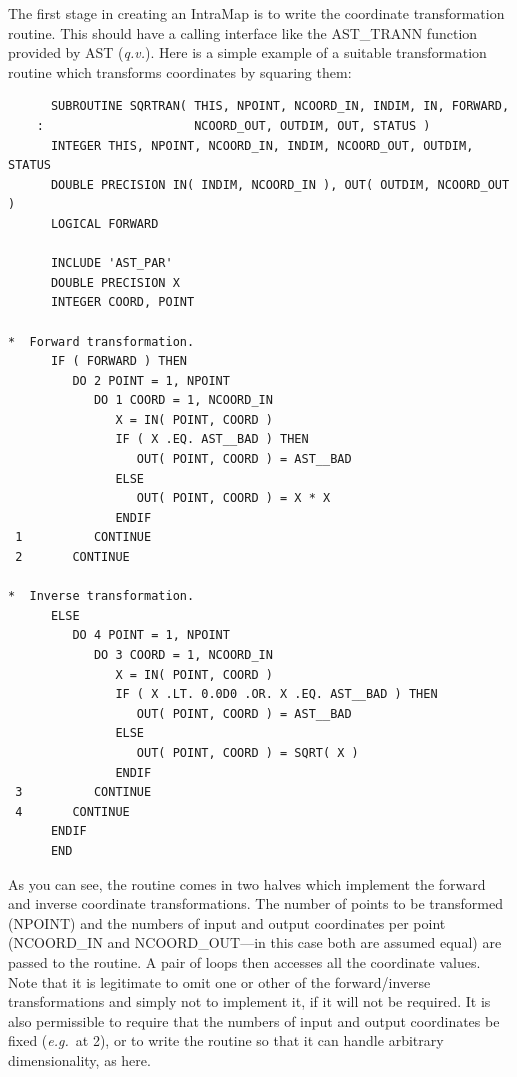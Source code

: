 \documentclass[twoside,11pt]{article}
\newcommand{\htmlref}[2]{#1}
\newcommand{\xlabel}[1]{}
\begin{document}
The first stage in creating an \htmlref{IntraMap}{IntraMap} is to write the coordinate
transformation routine. This should have a calling interface like the
\htmlref{AST\_TRANN}{AST_TRANN} function provided by AST ({\em{q.v.}}). Here is a simple
example of a suitable transformation routine which transforms
coordinates by squaring them:
\xlabel{SqrTran}

\small
\begin{verbatim}
      SUBROUTINE SQRTRAN( THIS, NPOINT, NCOORD_IN, INDIM, IN, FORWARD,
    :                     NCOORD_OUT, OUTDIM, OUT, STATUS )
      INTEGER THIS, NPOINT, NCOORD_IN, INDIM, NCOORD_OUT, OUTDIM, STATUS
      DOUBLE PRECISION IN( INDIM, NCOORD_IN ), OUT( OUTDIM, NCOORD_OUT )
      LOGICAL FORWARD

      INCLUDE 'AST_PAR'
      DOUBLE PRECISION X
      INTEGER COORD, POINT

*  Forward transformation.
      IF ( FORWARD ) THEN
         DO 2 POINT = 1, NPOINT
            DO 1 COORD = 1, NCOORD_IN
               X = IN( POINT, COORD )
               IF ( X .EQ. AST__BAD ) THEN
                  OUT( POINT, COORD ) = AST__BAD
               ELSE
                  OUT( POINT, COORD ) = X * X
               ENDIF
 1          CONTINUE
 2       CONTINUE

*  Inverse transformation.
      ELSE
         DO 4 POINT = 1, NPOINT
            DO 3 COORD = 1, NCOORD_IN
               X = IN( POINT, COORD )
               IF ( X .LT. 0.0D0 .OR. X .EQ. AST__BAD ) THEN
                  OUT( POINT, COORD ) = AST__BAD
               ELSE
                  OUT( POINT, COORD ) = SQRT( X )
               ENDIF
 3          CONTINUE
 4       CONTINUE
      ENDIF
      END
\end{verbatim}
\normalsize

As you can see, the routine comes in two halves which implement the
forward and inverse coordinate transformations. The number of points
to be transformed (NPOINT) and the numbers of input and output
coordinates per point (NCOORD\_IN and NCOORD\_OUT---in this case both
are assumed equal) are passed to the routine. A pair of loops then
accesses all the coordinate values.  Note that it is legitimate to
omit one or other of the forward/inverse transformations and simply
not to implement it, if it will not be required. It is also
permissible to require that the numbers of input and output
coordinates be fixed ({\em{e.g.}}\ at 2), or to write the routine so
that it can handle arbitrary dimensionality, as here.
\end{document}

